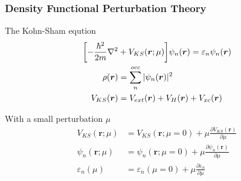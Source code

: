 \begin{frame}
  \frametitle{Density Functional Perturbation Theory}


  \begin{multicols}{2}
    The Kohn-Sham eqution
    \begin{align*}
      \biggl[
        -{\hbar^2\over2m}\nabla^2 &+ V_{KS}(\boldsymbol{r}; \mu)
      \biggr]
      \psi_n(\boldsymbol{r})
      =
      \varepsilon_n
      \psi_n(\boldsymbol{r}) \\
      \rho(\boldsymbol{r})
      & =
      \sum_n^{occ} |\psi_n(\boldsymbol{r})|^2 \\
      V_{KS}(\boldsymbol{r})
      & =
      V_{ext}(\boldsymbol{r}) +
      V_{H}(\boldsymbol{r}) +
      V_{xc}(\boldsymbol{r})
    \end{align*}

    With a small perturbation $\mu$
    \begin{align*}
      V_{KS}(\boldsymbol{r}; \mu)
      & =
      V_{KS}(\boldsymbol{r}; \mu=0) +
      \mu \frac{
        \partial V_{KS}(\boldsymbol{r})
      }{
        \partial \mu
      } \\
      \psi_n(\boldsymbol{r}; \mu)
      & =
      \psi_n(\boldsymbol{r}; \mu=0) +
      \mu \frac{
        \partial \psi_n(\boldsymbol{r})
      }{
        \partial \mu
      } \\
      \varepsilon_n(\mu)
      & =
      \varepsilon_n(\mu=0) +
      \mu \frac{
        \partial \varepsilon_n
      }{
        \partial \mu
      }
    \end{align*}
  \end{multicols}
  

\end{frame}

